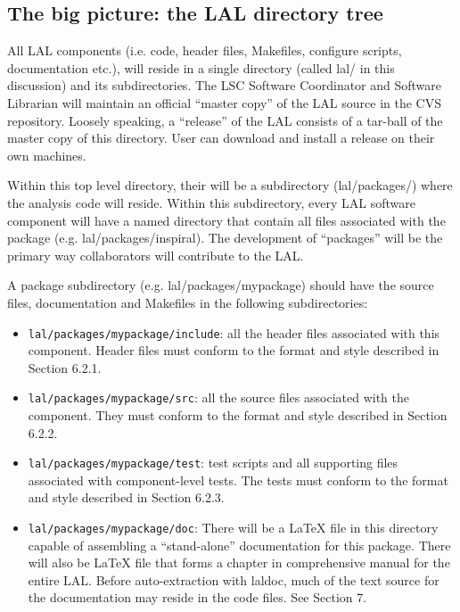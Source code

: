 \documentclass[]{ligodcc}
\begin{document}
\subsection{The big picture: the LAL directory tree}
All LAL components (i.e. code, header files, Makefiles, configure
scripts, documentation etc.), will reside in a single directory
(called lal/ in this discussion) and its subdirectories.  The LSC
Software Coordinator and Software Librarian will maintain an official
``master copy'' of the LAL source in the CVS repository. Loosely
speaking, a ``release'' of the LAL consists of a tar-ball of the
master copy of this directory. User can download and install a release
on their own machines.

Within this top level directory, their will be a subdirectory
(lal/packages/) where the analysis code will reside. Within this
subdirectory, every LAL software component will have a named directory
that contain all files associated with the package (e.g.
lal/packages/inspiral). The development of ``packages'' will be the
primary way  collaborators will contribute to the LAL.

A package subdirectory  (e.g. lal/packages/mypackage) should have the
source files, documentation  and Makefiles in the following
subdirectories:

\begin{itemize}
\item
{\tt lal/packages/mypackage/include}: all the header files
associated with this component.  Header files must conform to the
format and style described in Section 6.2.1.

\item
{\tt lal/packages/mypackage/src}:  all the source files associated
with the component. They must conform to the format and style
described in Section 6.2.2.


\item
{\tt lal/packages/mypackage/test}:  test scripts and all supporting
files  associated with component-level tests. The tests must conform
to the format and style described in Section 6.2.3.

\item
{\tt lal/packages/mypackage/doc}: There will be a LaTeX file in this
directory capable of assembling a ``stand-alone'' documentation for
this package. There will also be LaTeX file that forms a chapter in
comprehensive manual for the entire LAL. Before auto-extraction with
laldoc, much of the text source for the documentation may reside in
the code files. See Section 7.

\end{itemize}
\end{document}
